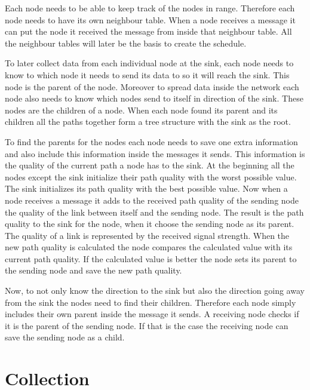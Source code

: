 Each node needs to be able to keep track of the nodes in range. Therefore each node needs to have its own neighbour table. When a node receives a message it can put the node it received the message from inside that neighbour table. All the neighbour tables will later be the basis to create the schedule.

To later collect data from each individual node at the sink, each node needs to know to which node it needs to send its data to so it will reach the sink. This node is the parent of the node. Moreover to spread data inside the network each node also needs to know which nodes send to itself in direction of the sink. These nodes are the children of a node. When each node found its parent and its children all the paths together form a tree structure with the sink as the root.

To find the parents for the nodes each node needs to save one extra information and also include this information inside the messages it sends. This information is the quality of the current path a node has to the sink. At the beginning all the nodes except the sink initialize their path quality with the worst possible value. The sink initializes its path quality with the best possible value. Now when a node receives a message it adds to the received path quality of the sending node the quality of the link between itself and the sending node. The result is the path quality to the sink for the node, when it choose the sending node as its parent. The quality of a link is represented by the received signal strength. When the new path quality is calculated the node compares the calculated value with its current path quality. If the calculated value is better the node sets its parent to the sending node and save the new path quality. 

Now, to not only know the direction to the sink but also the direction going away from the sink the nodes need to find their children. Therefore each node simply includes their own parent inside the message it sends. A receiving node checks if it is the parent of the sending node. If that is the case the receiving node can save the sending node as a child.       

\section{Collection}
\label{chp:apr_collection}

